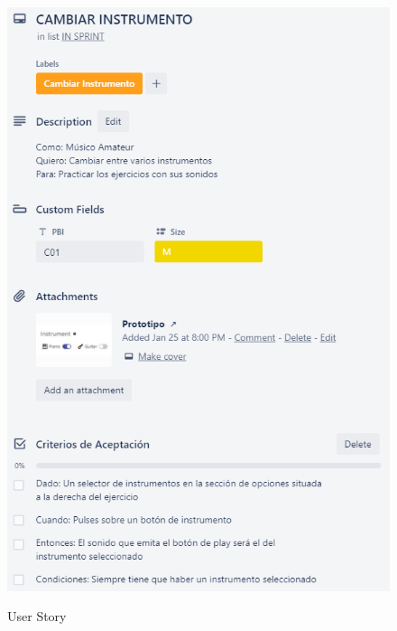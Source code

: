 \documentclass[12pt,twoside,titlepage]{report}
\begin{document}
\begin{figure}[H]
    \centering
    \includegraphics[scale=1.3]{Scrum/User Stories/Instrumentos}
    \label{fig:Instrumentos}
    \caption{User Story}
\end{figure}
\end{document}

